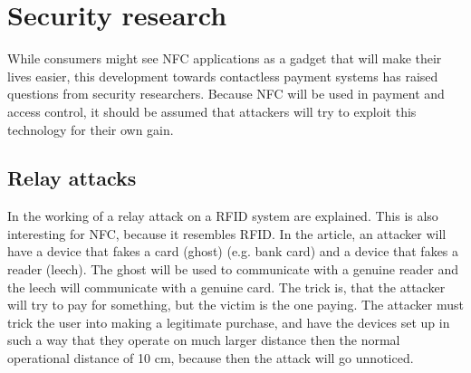 \section{Security research}

While consumers might see NFC applications as a gadget that will make their lives easier, this development towards contactless payment systems has raised questions from security researchers.
Because NFC will be used in payment and access control, it should be assumed that attackers will try to exploit this technology for their own gain. 


\subsection{Relay attacks}

In \cite{1128470} the working of a relay attack on  a RFID system are explained.
This is also interesting for NFC, because it resembles RFID.
In the article, an attacker will have a device that fakes a card (ghost) (e.g. bank card) and a device that fakes a reader (leech). 
The ghost will be used to communicate with a genuine reader and the leech will communicate with a genuine card.
The trick is, that the attacker will try to pay for something, but the victim is the one paying.
The attacker must trick the user into making a legitimate purchase, and have the devices set up in such a way that they operate on much larger distance then the normal operational distance of 10 cm, because then the attack will go unnoticed.

